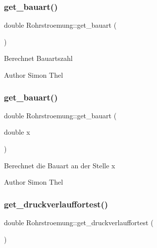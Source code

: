 \subsubsection{\texorpdfstring{get\+\_\+bauart()}{get\_bauart()}\hspace{0.1cm}{\footnotesize\ttfamily [1/2]}}
{\footnotesize\ttfamily double Rohrstroemung\+::get\+\_\+bauart (\begin{DoxyParamCaption}{ }\end{DoxyParamCaption})}

Berechnet Bauartszahl \begin{DoxyAuthor}{Author}
Simon Thel 
\end{DoxyAuthor}
\mbox{\label{class_rohrstroemung_a17fccbf71ba0dc1635e3a06fdc740cf3}} 
\subsubsection{\texorpdfstring{get\+\_\+bauart()}{get\_bauart()}\hspace{0.1cm}{\footnotesize\ttfamily [2/2]}}
{\footnotesize\ttfamily double Rohrstroemung\+::get\+\_\+bauart (\begin{DoxyParamCaption}\item[{double}]{x }\end{DoxyParamCaption})}

Berechnet die Bauart an der Stelle x \begin{DoxyAuthor}{Author}
Simon Thel 
\end{DoxyAuthor}
\mbox{\label{class_rohrstroemung_a1f0c06b0e89a1d8ffaf073038efdddd9}} 
\subsubsection{\texorpdfstring{get\+\_\+druckverlauffortest()}{get\_druckverlauffortest()}}
{\footnotesize\ttfamily double Rohrstroemung\+::get\+\_\+druckverlauffortest (\begin{DoxyParamCaption}{ }\end{DoxyParamCaption})}

